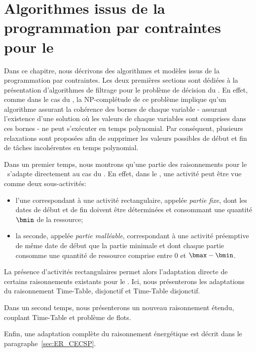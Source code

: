 \chapter{Algorithmes issus de la programmation par contraintes pour le
\CECSP}
\label{sec:PPC_CECSP}
Dans ce chapitre, nous décrivons des algorithmes et modèles issus de
la programmation par contraintes. Les deux premières sections sont
dédiées à la présentation d'algorithmes de filtrage pour le problème
de décision du \CECSP. En effet, comme dans le cas du \CUSP, la
NP-complétude de ce problème implique qu'un algorithme assurant la
cohérence des bornes de chaque variable - assurant l'existence d'une
solution où les valeurs de chaque variables sont comprises dans ces
bornes - ne peut s'exécuter en temps polynomial. Par conséquent,
plusieurs relaxations sont proposées afin de supprimer les valeurs
possibles de début et fin de tâches incohérentes en temps polynomial.

Dans un premier temps, nous montrons qu'une partie des raisonnements
pour le \CUSP~s'adapte directement au cas du \CECSP. En effet, dans le
\CECSP, une activité peut être vue comme deux sous-activités: 
\begin{itemize}
\item l'une correspondant à une activité rectangulaire, appelée {\it
partie fixe}, dont les dates de début et de fin doivent être
déterminées et consommant une quantité $\bmin$ de la ressource;
\item la seconde, appelée {\it partie malléable}, correspondant à une
activité préemptive de même date de début que la partie minimale et
dont chaque partie consomme une quantité de ressource comprise entre
$0$ et $\bmax-\bmin$.
\end{itemize}
La présence d'activités rectangulaires permet alors l'adaptation directe
de certains raisonnements existants pour le \CUSP. Ici, nous
présenterons les adaptations du raisonnement Time-Table, disjonctif et
Time-Table disjonctif. 

Dans un second temps, nous présenterons un nouveau raisonnement
étendu, couplant Time-Table et problème de flots. 

Enfin, une adaptation complète du raisonnement énergétique est décrit
dans le paragraphe~\ref{sec:ER_CECSP}.






%

